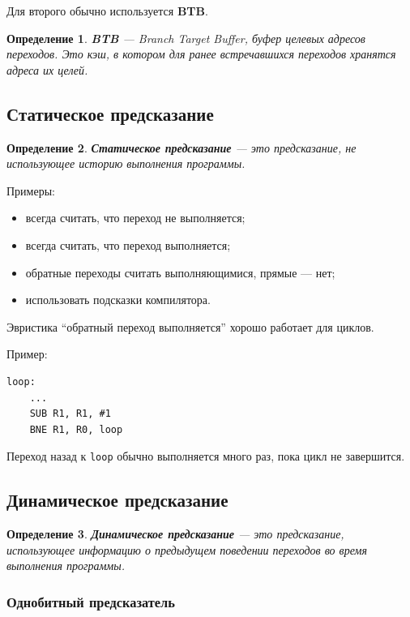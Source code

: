 \documentclass[12pt,a4paper]{article}
\newtheorem{definition}{Определение}
\begin{document}
Для второго обычно используется \textbf{BTB}.

\begin{definition}
\textbf{BTB} --- Branch Target Buffer, буфер целевых адресов переходов. Это кэш, в котором для ранее встречавшихся переходов хранятся адреса их целей.
\end{definition}

\subsection{Статическое предсказание}

\begin{definition}
\textbf{Статическое предсказание} --- это предсказание, не использующее историю выполнения программы.
\end{definition}

Примеры:

\begin{itemize}
    \item всегда считать, что переход не выполняется;
    \item всегда считать, что переход выполняется;
    \item обратные переходы считать выполняющимися, прямые --- нет;
    \item использовать подсказки компилятора.
\end{itemize}

Эвристика ``обратный переход выполняется'' хорошо работает для циклов.

Пример:

\begin{lstlisting}
loop:
    ...
    SUB R1, R1, #1
    BNE R1, R0, loop
\end{lstlisting}

Переход назад к \texttt{loop} обычно выполняется много раз, пока цикл не завершится.

\subsection{Динамическое предсказание}

\begin{definition}
\textbf{Динамическое предсказание} --- это предсказание, использующее информацию о предыдущем поведении переходов во время выполнения программы.
\end{definition}

\subsubsection{Однобитный предсказатель}
\end{document}
